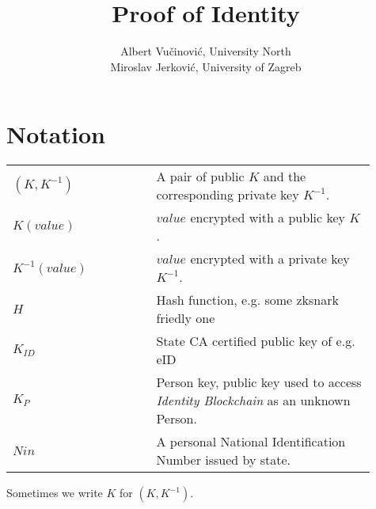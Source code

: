 \documentclass{article}
\title{Proof of Identity}
\author{
Albert Vučinović, University North\\
Miroslav Jerković, University of Zagreb
}
\newcommand{\khk}{K_{P}}
\newcommand{\kid}{K_{ID}}
\newcommand{\pbc}{\textit{Identity Blockchain}}
\begin{document}
\maketitle
\section{Notation}
\begin{tabular}{p{0.36\linewidth}|p{0.55\linewidth}}
  $(K, K^{-1})$ & A pair of public $K$ and the corresponding private key $K^{-1}$. \\
	$K(value)$ & $value$ encrypted with a public key $K$. \\
	$K^{-1}(value)$ & $value$ encrypted with a private key $K^{-1}$. \\
  $H$ & Hash function, e.g. some zksnark friedly one \\
	$\kid$ &  State CA certified public key of e.g. eID\\
  $\khk$ & Person key, public key used to access \pbc{} as an unknown Person. \\
  $Nin$ & A personal National Identification Number issued by state.
\end{tabular}

Sometimes we write $K$ for $(K, K^{-1})$.

\newpage
\end{document}
